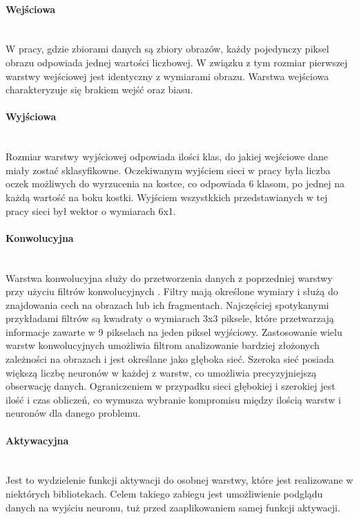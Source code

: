 \paragraph{Wejściowa} \mbox{}\\
W pracy, gdzie zbiorami danych są zbiory obrazów, każdy pojedynczy piksel obrazu
odpowiada jednej wartości liczbowej. W związku z tym rozmiar pierwszej warstwy
wejściowej jest identyczny z wymiarami obrazu. Warstwa wejściowa charakteryzuje się
brakiem wejść oraz biasu.

\paragraph{Wyjściowa} \mbox{}\\
Rozmiar warstwy wyjściowej odpowiada ilości klas, do jakiej wejściowe dane miały
zostać sklasyfikowne. Oczekiwanym wyjściem sieci w pracy była liczba oczek możliwych
do wyrzucenia na kostce, co odpowiada 6 klasom, po jednej na każdą wartość na boku
kostki. Wyjściem wszystkkich przedstawianych w tej pracy sieci był wektor o wymiarach
6x1.

\paragraph{Konwolucyjna} \mbox{}\\
Warstwa konwolucyjna służy do przetworzenia danych z poprzedniej warstwy przy użyciu
filtrów konwolucyjnych \cite{CS231n}. Filtry mają określone wymiary i służą do znajdowania cech
na obrazach lub ich fragmentach. Najczęściej spotykanymi przykładami filtrów są
kwadraty o wymiarach 3x3 piksele, które przetwarzają informacje zawarte w 9 pikselach
na jeden piksel wyjściowy.
Zastosowanie wielu warstw konwolucyjnych umożliwia filtrom analizowanie bardziej złożonych
zależności na obrazach i jest określane jako głęboka sieć. Szeroka sieć posiada większą
liczbę neuronów w każdej z warstw, co umożliwia precyzyjniejszą obserwację danych.
Ograniczeniem w przypadku sieci głębokiej i szerokiej jest ilość i czas obliczeń, co
wymusza wybranie kompromisu między ilością warstw i neuronów dla danego problemu.

\paragraph{Aktywacyjna} \mbox{}\\
Jest to wydzielenie funkcji aktywacji do osobnej warstwy, które jest realizowane
w niektórych bibliotekach. Celem takiego zabiegu jest umożliwienie podglądu danych
na wyjściu neuronu, tuż przed zaaplikowaniem samej funkcji aktywacji.

